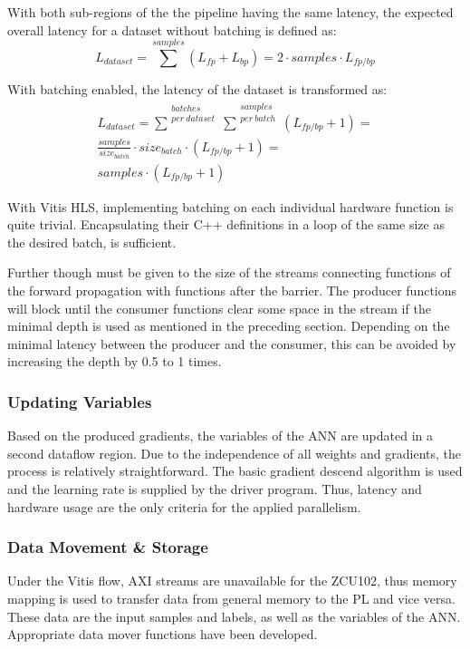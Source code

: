 With both sub-regions of the the pipeline having the same latency, the expected overall latency for a dataset without batching is defined as: %
\begin{equation}
L_{dataset} = \sum^{samples}( L_{fp} + L_{bp} ) = 2 \cdot samples \cdot L_{fp/bp}
	\label{eqn: latency dataset no batching}
\end{equation}

With batching enabled, the latency of the dataset is transformed as:
\begin{equation}
    \begin{gathered}
        L_{dataset} = \sum^{\substack{batches\\ per\ dataset}}\sum^{\substack{samples\\ per\ batch}}( L_{fp/bp} + 1 ) =\\
        \frac{samples}{size_{batch}} \cdot size_{batch} \cdot ( L_{fp/bp} + 1 ) =\\
        samples \cdot ( L_{fp/bp} + 1 )
    \end{gathered}
	\label{eqn: latency dataset with batching}
\end{equation}

With Vitis HLS, implementing batching on each individual hardware function is quite trivial. Encapsulating their C++ definitions in a loop of the same size as the desired batch, is sufficient. %

Further though must be given to the size of the streams connecting functions of the forward propagation with functions after the barrier. The producer functions will block until the consumer functions clear some space in the stream if the minimal depth is used as mentioned in the preceding section. Depending on the minimal latency between the producer and the consumer, this can be avoided by increasing the depth by 0.5 to 1 times.

\subsubsection{Updating Variables}
Based on the produced gradients, the variables of the ANN are updated in a second dataflow region. Due to the independence of all weights and gradients, the process is relatively straightforward. The basic gradient descend algorithm is used and the learning rate is supplied by the driver program. Thus, latency and hardware usage are the only criteria for the applied parallelism.

\subsubsection{Data Movement \& Storage}
Under the Vitis flow, AXI streams are unavailable for the ZCU102, thus memory mapping is used to transfer data from general memory to the PL and vice versa. These data are the input samples and labels, as well as the variables of the ANN. Appropriate data mover functions have been developed. %

